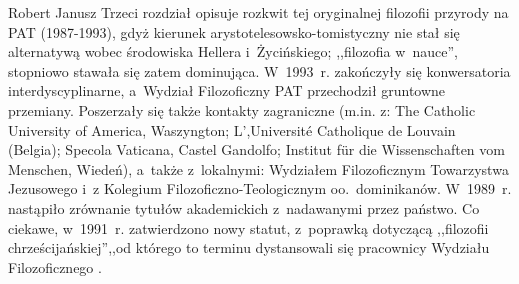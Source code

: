 \begin{newrevplenv}{Robert Janusz}
Trzeci rozdział opisuje rozkwit tej oryginalnej filozofii przyrody na PAT (1987-1993), gdyż kierunek arystotelesowsko-tomistyczny nie stał się alternatywą wobec środowiska Hellera i~Życińskiego; ,,filozofia w~nauce'', stopniowo stawała się zatem dominująca. W~1993~r. zakończyły się konwersatoria interdyscyplinarne, a~Wydział Filozoficzny PAT przechodził gruntowne przemiany. Poszerzały się także kontakty zagraniczne (m.in. z: The Catholic University of America, Waszyngton; L',Université Catholique de Louvain (Belgia); Specola Vaticana, Castel Gandolfo; Institut für die Wissenschaften vom Menschen, Wiedeń), a~także z~lokalnymi: Wydziałem Filozoficznym Towarzystwa Jezusowego i~z Kolegium Filozoficzno-Teologicznym oo.~dominikanów. W~1989~r. nastąpiło zrównanie tytułów akademickich z~nadawanymi przez państwo. Co ciekawe, w~1991~r. zatwierdzono nowy statut, z~poprawką dotyczącą ,,filozofii chrześcijańskiej'',,od którego to terminu dystansowali się pracownicy Wydziału Filozoficznego
\parencite[][s.~168–169]{trombik_koncepcje_2021}. %

\end{newrevplenv}
